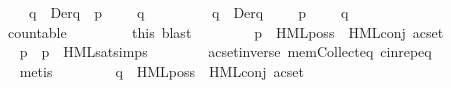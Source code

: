 \begin{isabellebody}
\ \ \ \ \ \ {\isacartoucheopen}{\isasymforall}{\isasymphi}\ {\isasymin}\ {\isasymPhi}{\isachardot}{\kern0pt}\ {\isasymexists}q{\isacharprime}{\kern0pt}\ {\isasymin}\ Der{\isacharparenleft}{\kern0pt}q{\isacharcomma}{\kern0pt}\ {\isasymalpha}{\isacharparenright}{\kern0pt}{\isachardot}{\kern0pt}\ p{\isacharprime}{\kern0pt}\ {\isasymTurnstile}\ {\isasymphi}\ {\isasymand}\ {\isasymnot}\ q{\isacharprime}{\kern0pt}\ {\isasymTurnstile}\ {\isasymphi}{\isacartoucheclose}\ \isanewline
\ \ \ \ \ \ {\isacartoucheopen}{\isasymforall}q{\isacharprime}{\kern0pt}\ {\isasymin}\ Der{\isacharparenleft}{\kern0pt}q{\isacharcomma}{\kern0pt}\ {\isasymalpha}{\isacharparenright}{\kern0pt}{\isachardot}{\kern0pt}\ {\isasymexists}{\isasymphi}\ {\isasymin}\ {\isasymPhi}{\isachardot}{\kern0pt}\ p{\isacharprime}{\kern0pt}\ {\isasymTurnstile}\ {\isasymphi}\ {\isasymand}\ {\isasymnot}\ q{\isacharprime}{\kern0pt}\ {\isasymTurnstile}\ {\isasymphi}{\isacartoucheclose}\ \isanewline
\ \ \ \ \ \ {\isacartoucheopen}countable\ {\isasymPhi}{\isacartoucheclose}\isanewline
\ \ \ \ \ \ \isamarkupfalse%
\ {\isacharparenleft}{\kern0pt}this{\isacharcomma}{\kern0pt}\ blast{\isacharplus}{\kern0pt}{\isacharparenright}{\kern0pt}\isanewline
\ \ \isanewline
\ \ \ \ \isamarkupfalse%
\ {\isacartoucheopen}p\ {\isasymTurnstile}\ HML{\isacharunderscore}{\kern0pt}poss\ {\isasymalpha}\ {\isacharparenleft}{\kern0pt}HML{\isacharunderscore}{\kern0pt}conj\ {\isacharparenleft}{\kern0pt}acset\ {\isasymPhi}{\isacharparenright}{\kern0pt}{\isacharparenright}{\kern0pt}{\isacartoucheclose}\isanewline
\ \ \ \ \ \ \isamarkupfalse%
\ {\isacartoucheopen}p\ {\isasymlongmapsto}{\isasymalpha}\ p{\isacharprime}{\kern0pt}{\isacartoucheclose}\ {\isacharasterisk}{\kern0pt}{\isacharparenleft}{\kern0pt}{}{\isacharcomma}{\kern0pt}{}{\isacharparenright}{\kern0pt}\ HML{\isacharunderscore}{\kern0pt}sat{\isachardot}{\kern0pt}simps{\isacharparenleft}{\kern0pt}{}{\isacharcomma}{\kern0pt}{}{\isacharparenright}{\kern0pt}\isanewline
\ \ \ \ \ \ \ \ acset{\isacharunderscore}{\kern0pt}inverse\ mem{\isacharunderscore}{\kern0pt}Collect{\isacharunderscore}{\kern0pt}eq\ cin{\isachardot}{\kern0pt}rep{\isacharunderscore}{\kern0pt}eq\isanewline
\ \ \ \ \ \ \isamarkupfalse%
\ metis\isanewline
\isanewline
\ \ \ \ \isamarkupfalse%
\ \isamarkupfalse%
\ {\isacartoucheopen}{\isasymnot}\ q\ {\isasymTurnstile}\ HML{\isacharunderscore}{\kern0pt}poss\ {\isasymalpha}\ {\isacharparenleft}{\kern0pt}HML{\isacharunderscore}{\kern0pt}conj\ {\isacharparenleft}{\kern0pt}acset\ {\isasymPhi}{\isacharparenright}{\kern0pt}{\isacharparenright}{\kern0pt}{\isacartoucheclose}\isanewline

\end{isabellebody}
